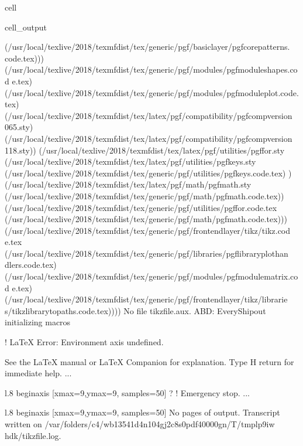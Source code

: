 \documentclass[letterpaper,10pt,english]{jupyterBook}
\begin{document}
\begin{sphinxuseclass}{cell}
\begin{sphinxVerbatimOutput}
\begin{sphinxuseclass}{cell_output}
\begin{sphinxVerbatim}[commandchars=\\\{\}]
(/usr/local/texlive/2018/texmf\PYGZhy{}dist/tex/generic/pgf/basiclayer/pgfcorepatterns.
code.tex)))
(/usr/local/texlive/2018/texmf\PYGZhy{}dist/tex/generic/pgf/modules/pgfmoduleshapes.cod
e.tex)
(/usr/local/texlive/2018/texmf\PYGZhy{}dist/tex/generic/pgf/modules/pgfmoduleplot.code.
tex)
(/usr/local/texlive/2018/texmf\PYGZhy{}dist/tex/latex/pgf/compatibility/pgfcomp\PYGZhy{}version
\PYGZhy{}0\PYGZhy{}65.sty)
(/usr/local/texlive/2018/texmf\PYGZhy{}dist/tex/latex/pgf/compatibility/pgfcomp\PYGZhy{}version
\PYGZhy{}1\PYGZhy{}18.sty))
(/usr/local/texlive/2018/texmf\PYGZhy{}dist/tex/latex/pgf/utilities/pgffor.sty
(/usr/local/texlive/2018/texmf\PYGZhy{}dist/tex/latex/pgf/utilities/pgfkeys.sty
(/usr/local/texlive/2018/texmf\PYGZhy{}dist/tex/generic/pgf/utilities/pgfkeys.code.tex)
) (/usr/local/texlive/2018/texmf\PYGZhy{}dist/tex/latex/pgf/math/pgfmath.sty
(/usr/local/texlive/2018/texmf\PYGZhy{}dist/tex/generic/pgf/math/pgfmath.code.tex))
(/usr/local/texlive/2018/texmf\PYGZhy{}dist/tex/generic/pgf/utilities/pgffor.code.tex
(/usr/local/texlive/2018/texmf\PYGZhy{}dist/tex/generic/pgf/math/pgfmath.code.tex)))
(/usr/local/texlive/2018/texmf\PYGZhy{}dist/tex/generic/pgf/frontendlayer/tikz/tikz.cod
e.tex
(/usr/local/texlive/2018/texmf\PYGZhy{}dist/tex/generic/pgf/libraries/pgflibraryplothan
dlers.code.tex)
(/usr/local/texlive/2018/texmf\PYGZhy{}dist/tex/generic/pgf/modules/pgfmodulematrix.cod
e.tex)
(/usr/local/texlive/2018/texmf\PYGZhy{}dist/tex/generic/pgf/frontendlayer/tikz/librarie
s/tikzlibrarytopaths.code.tex))))
No file tikzfile.aux.
ABD: EveryShipout initializing macros

! LaTeX Error: Environment axis undefined.

See the LaTeX manual or LaTeX Companion for explanation.
Type  H \PYGZlt{}return\PYGZgt{}  for immediate help.
 ...                                              
                                                  
l.8 \PYGZbs{}begin\PYGZob{}axis\PYGZcb{}
                [xmax=9,ymax=9, samples=50]
? 
! Emergency stop.
 ...                                              
                                                  
l.8 \PYGZbs{}begin\PYGZob{}axis\PYGZcb{}
                [xmax=9,ymax=9, samples=50]
No pages of output.
Transcript written on /var/folders/c4/wb13541d4n104gj2c8s0pdf40000gn/T/tmplp9iw
hdk/tikzfile.log.
\end{sphinxVerbatim}


\end{sphinxuseclass}
\end{sphinxVerbatimOutput}
\end{sphinxuseclass}
\end{document}
